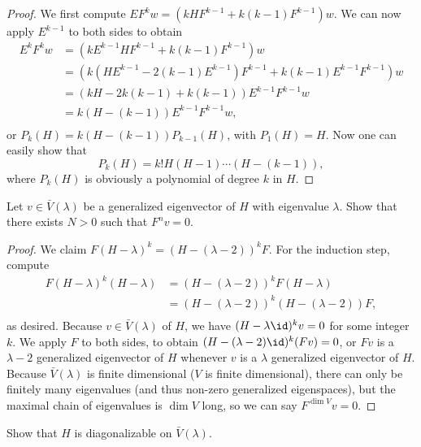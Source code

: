 \documentclass{article}
\begin{document}
\begin{proof}
We first compute $E F^k w = (k H F^{k - 1} + k(k - 1) F^{k - 1}) w$. We can now
apply $E^{k - 1}$ to both sides to obtain
\[ \begin{aligned}
E^k F^k w &= (k E^{k - 1} H F^{k - 1} + k(k - 1) F^{k - 1}) w \\
&= (k (H E^{k - 1} - 2(k - 1) E^{k - 1}) F^{k - 1} + k(k - 1) E^{k - 1} F^{k -
1}) w \\
&= (k H - 2k(k - 1) + k(k - 1)) E^{k - 1} F^{k - 1} w \\
&= k (H - (k - 1)) E^{k - 1} F^{k - 1} w, \\
\end{aligned} \]
or $P_k(H) = k(H - (k - 1)) P_{k - 1}(H)$, with $P_1(H) = H$. Now one can easily
show that
\[ P_k(H) = k! H (H - 1) \cdots (H - (k - 1)), \]
where $P_k(H)$ is obviously a polynomial of degree $k$ in $H$.
\end{proof}

\begin{prop}
Let $v \in \bar{V}(\lambda)$ be a generalized eigenvector of $H$ with eigenvalue
$\lambda$. Show that there exists $N > 0$ such that $F^n v = 0$.
\end{prop}

\begin{proof}
We claim $F(H - \lambda)^k = (H - (\lambda - 2))^k F$. For the induction step,
compute
\[ \begin{aligned}
F(H - \lambda)^k (H - \lambda) &= (H - (\lambda - 2))^k F (H - \lambda) \\
&= (H - (\lambda - 2))^k (H - (\lambda - 2)) F, \\
\end{aligned} \]
as desired. Because $v \in \bar{V}(\lambda)$ of $H$, we have $(H - \lambda
\id)^k v = 0$ for some integer $k$. We apply $F$ to both sides, to obtain $(H -
(\lambda - 2) \id)^k (Fv) = 0$, or $Fv$ is a $\lambda - 2$ generalized
eigenvector of $H$ whenever $v$ is a $\lambda$ generalized eigenvector of $H$.
Because $\bar{V}(\lambda)$ is finite dimensional ($V$ is finite dimensional),
there can only be finitely many eigenvalues (and thus non-zero generalized
eigenspaces), but the maximal chain of eigenvalues is $\dim V$ long, so we can
say $F^{\dim V} v = 0$.
\end{proof}

\begin{prop}
Show that $H$ is diagonalizable on $\bar{V}(\lambda)$.
\end{prop}
\end{document}
